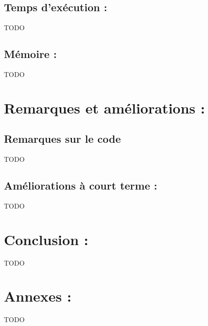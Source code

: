 \documentclass[12pt, a4paper]{article}
\begin{document}
\subsection{Temps d'exécution :}
TODO






\subsection{Mémoire :}
TODO


\section{Remarques et améliorations  :}

\subsection{Remarques sur le code}
TODO

\subsection{Améliorations à court terme :}
TODO


\clearpage

\section{Conclusion :}
TODO



\section{Annexes :}
TODO
\end{document}
